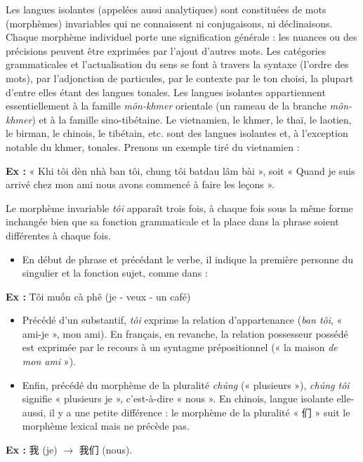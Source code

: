 Les langues isolantes (appelées aussi analytiques) sont constituées de mots (morphèmes) invariables qui ne connaissent ni conjugaisons, ni déclinaisons. Chaque morphème individuel porte une signification générale : les nuances ou des précisions peuvent être exprimées par l’ajout d’autres mots. Les catégories grammaticales et l’actualisation du sens se font à travers la syntaxe (l’ordre des mots), par l’adjonction de particules, par le contexte par le ton choisi, la plupart d’entre elles étant des langues tonales. Les langues isolantes appartiennent essentiellement à la famille \textit{môn-khmer} orientale (un rameau de la branche \textit{môn-khmer}) et à la famille sino-tibétaine. Le vietnamien, le khmer, le thaï, le laotien, le birman, le chinois, le tibétain, etc. sont des langues isolantes et, à l’exception notable du khmer, tonales. Prenons un exemple tiré du vietnamien :

\noindent\textbf{Ex :} « Khi tôi dèn nhà ban tôi, chung tôi batdau lâm bài », soit « Quand je suis arrivé chez mon ami nous avons commencé à faire les leçons ».

Le morphème invariable \textit{tôi} apparaît trois fois, à chaque fois sous la même forme inchangée bien que sa fonction grammaticale et la place dans la phrase soient différentes à chaque fois.
\begin{itemize}
\item En début de phrase et précédant le verbe, il indique la première personne du singulier et la fonction sujet, comme dans :
\end{itemize}
\noindent\textbf{Ex :} Tôi muốn cà phê (je - veux - un café)
\begin{itemize}
\item Précédé d’un substantif, \textit{tôi} exprime la relation d’appartenance (\textit{ban tôi}, « ami-je », mon ami). En français, en revanche, la relation possesseur possédé est exprimée par le recours à un syntagme prépositionnel (« la maison \textit{de mon ami} »).
\item Enfin, précédé du morphème de la pluralité \textit{chúng} (« plusieurs »), \textit{chúng tôi} signifie « plusieurs je », c’est-à-dire « nous ». En chinois, langue isolante elle-aussi, il y a une petite différence : le morphème de la pluralité « 们 » suit le morphème lexical mais ne précède pas.
\end{itemize}
\noindent\textbf{Ex :} 我 (je) $\rightarrow$ 我们 (nous).

